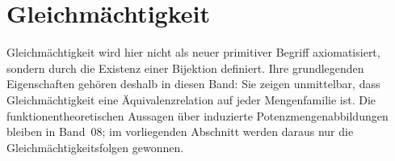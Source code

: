 \documentclass[main.tex]{subfiles}
\begin{document}
\begin{tabproofsplit}

\closeproofpart

  \setcounter{proofstepnr}{1}%

\closeproofpart

  \setcounter{proofstepnr}{2}%

\closeproofpart

  \setcounter{proofstepnr}{3}%

\closeproofpart
\end{tabproofsplit}

\section{Gleichmächtigkeit}

Gleichmächtigkeit wird hier nicht als neuer primitiver Begriff axiomatisiert,
sondern durch die Existenz einer Bijektion definiert. Ihre grundlegenden
Eigenschaften gehören deshalb in diesen Band: Sie zeigen unmittelbar, dass
Gleichmächtigkeit eine Äquivalenzrelation auf jeder Mengenfamilie ist. Die
funktionentheoretischen Aussagen über induzierte Potenzmengenabbildungen
bleiben in Band~08; im vorliegenden Abschnitt werden daraus nur die
Gleichmächtigkeitsfolgen gewonnen.

\end{document}
